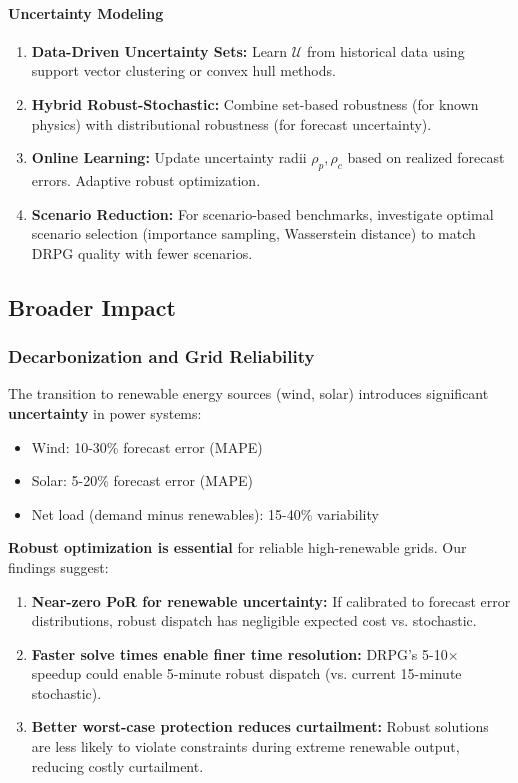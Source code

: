 \paragraph{Uncertainty Modeling}

\begin{enumerate}
    \item \textbf{Data-Driven Uncertainty Sets:} Learn $\mathcal{U}$ from historical data using support vector clustering or convex hull methods.

    \item \textbf{Hybrid Robust-Stochastic:} Combine set-based robustness (for known physics) with distributional robustness (for forecast uncertainty).

    \item \textbf{Online Learning:} Update uncertainty radii $\rho_p, \rho_c$ based on realized forecast errors. Adaptive robust optimization.

    \item \textbf{Scenario Reduction:} For scenario-based benchmarks, investigate optimal scenario selection (importance sampling, Wasserstein distance) to match DRPG quality with fewer scenarios.
\end{enumerate}

\subsection{Broader Impact}
\label{sec:broader_impact}

\subsubsection{Decarbonization and Grid Reliability}

The transition to renewable energy sources (wind, solar) introduces significant \textbf{uncertainty} in power systems:
\begin{itemize}
    \item Wind: 10-30\% forecast error (MAPE)
    \item Solar: 5-20\% forecast error (MAPE)
    \item Net load (demand minus renewables): 15-40\% variability
\end{itemize}

\textbf{Robust optimization is essential} for reliable high-renewable grids. Our findings suggest:
\begin{enumerate}
    \item \textbf{Near-zero PoR for renewable uncertainty:} If calibrated to forecast error distributions, robust dispatch has negligible expected cost vs. stochastic.

    \item \textbf{Faster solve times enable finer time resolution:} DRPG's 5-10$\times$ speedup could enable 5-minute robust dispatch (vs. current 15-minute stochastic).

    \item \textbf{Better worst-case protection reduces curtailment:} Robust solutions are less likely to violate constraints during extreme renewable output, reducing costly curtailment.
\end{enumerate}

